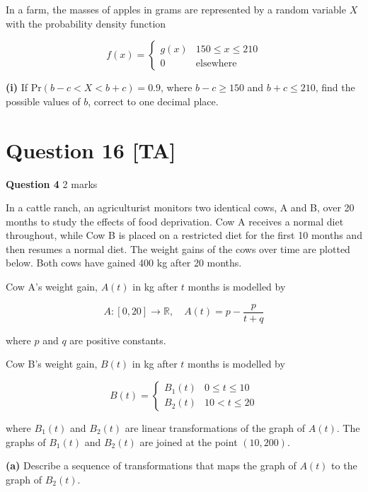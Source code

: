 \documentclass[12pt,a4paper]{article}
\begin{document}
In a farm, the masses of apples in grams are represented by a random variable $X$ with the probability density function

\[
f(x) = \begin{cases}
g(x) & 150 \leq x \leq 210\\
0 & \text{elsewhere}
\end{cases}
\]

\textbf{(i)} If $\text{Pr}(b - c < X < b + c) = 0.9$, where $b - c \geq 150$ and $b + c \leq 210$, find the possible values of $b$, correct to one decimal place.

\vspace{5\baselineskip}

\hrulefill

\section*{Question 16 [TA]}

\textbf{Question 4} \hfill 2 marks

In a cattle ranch, an agriculturist monitors two identical cows, A and B, over 20 months to study the effects of food deprivation. Cow A receives a normal diet throughout, while Cow B is placed on a restricted diet for the first 10 months and then resumes a normal diet. The weight gains of the cows over time are plotted below. Both cows have gained 400 kg after 20 months.

Cow A's weight gain, $A(t)$ in kg after $t$ months is modelled by

\[
A : [0,20] \to \mathbb{R}, \quad A(t) = p - \frac{p}{t + q}
\]

where $p$ and $q$ are positive constants.

Cow B's weight gain, $B(t)$ in kg after $t$ months is modelled by

\[
B(t) = \begin{cases}
B_1(t) & 0 \leq t \leq 10\\
B_2(t) & 10 < t \leq 20
\end{cases}
\]

where $B_1(t)$ and $B_2(t)$ are linear transformations of the graph of $A(t)$. The graphs of $B_1(t)$ and $B_2(t)$ are joined at the point $(10,200)$.

\textbf{(a)} Describe a sequence of transformations that maps the graph of $A(t)$ to the graph of $B_2(t)$.

\vspace{5\baselineskip}

\hrulefill
\end{document}
